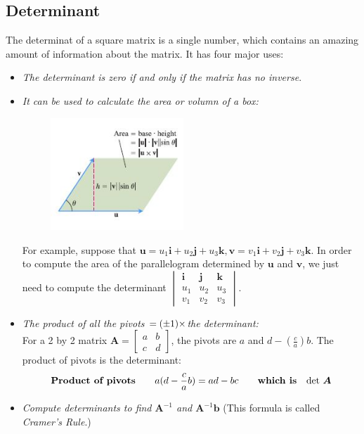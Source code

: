\subsection{Determinant}
The determinat of a square matrix is a single number, which contains an amazing amount of information about the matrix. It has four major uses:
\begin{itemize}
\item
\emph{The determinant is zero if and only if the matrix has no inverse}.
\item
\emph{It can be used to calculate the area or volumn of a box:}
\begin{figure}[H]\centering
\includegraphics[width=5cm]{week4/calculus}
\end{figure}
For example, suppose that $\bm u=u_1\bm i+u_2\bm j+u_3\bm k,\bm v=v_1\bm i+v_2\bm j+v_3\bm k$. In order to compute the area of the parallelogram determined by $\bm u$ and $\bm v$, we just need to compute the determinant
$\begin{vmatrix}
\bm i&\bm j&\bm k\\u_1&u_2&u_3\\v_1&v_2&v_3
\end{vmatrix}$.
\item
\emph{The product of all the pivots $=(\pm 1)\times$the determinant:}\\
For a 2 by 2 matrix $\bm A=\begin{bmatrix}
a&b\\c&d
\end{bmatrix}$, the pivots are $a$ and $d-(\frac{c}{a})b$. The product of pivots is the determinant:
\[
\text{\textbf{Product of pivots}}\qquad a(d-\frac{c}{a}b)=ad-bc\qquad\text{\textbf{which is}}\quad \text{det }\bm A
\]
\item
\emph{Compute determinants to find $\bm A^{-1}$ and $\bm A^{-1}\bm b$} (This formula is called \emph{Cramer's Rule}.)
\end{itemize}
